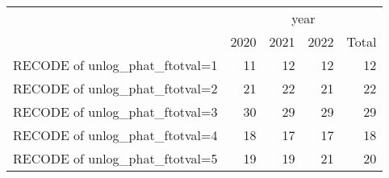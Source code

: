 \begin{tabular}{lllll}
\cline{1-5}
\multicolumn{1}{c}{} &
  \multicolumn{4}{|c}{year} \\
\multicolumn{1}{c}{} &
  \multicolumn{1}{|r}{2020} &
  \multicolumn{1}{r}{2021} &
  \multicolumn{1}{r}{2022} &
  \multicolumn{1}{r}{Total} \\
\cline{1-5}
\multicolumn{1}{l}{RECODE of unlog\_phat\_ftotval=1} &
  \multicolumn{1}{|r}{11} &
  \multicolumn{1}{r}{12} &
  \multicolumn{1}{r}{12} &
  \multicolumn{1}{r}{12} \\
\multicolumn{1}{l}{RECODE of unlog\_phat\_ftotval=2} &
  \multicolumn{1}{|r}{21} &
  \multicolumn{1}{r}{22} &
  \multicolumn{1}{r}{21} &
  \multicolumn{1}{r}{22} \\
\multicolumn{1}{l}{RECODE of unlog\_phat\_ftotval=3} &
  \multicolumn{1}{|r}{30} &
  \multicolumn{1}{r}{29} &
  \multicolumn{1}{r}{29} &
  \multicolumn{1}{r}{29} \\
\multicolumn{1}{l}{RECODE of unlog\_phat\_ftotval=4} &
  \multicolumn{1}{|r}{18} &
  \multicolumn{1}{r}{17} &
  \multicolumn{1}{r}{17} &
  \multicolumn{1}{r}{18} \\
\multicolumn{1}{l}{RECODE of unlog\_phat\_ftotval=5} &
  \multicolumn{1}{|r}{19} &
  \multicolumn{1}{r}{19} &
  \multicolumn{1}{r}{21} &
  \multicolumn{1}{r}{20} \\
\cline{1-5}
\end{tabular}
